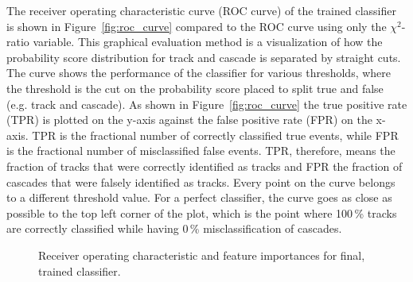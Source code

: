 The receiver operating characteristic curve (ROC curve) of the trained classifier is shown in Figure~\ref{fig:roc_curve} compared to the ROC curve using only the $\chi^2$-ratio variable.
This graphical evaluation method is a visualization of how the probability score distribution for track and cascade is separated by straight cuts.
The curve shows the performance of the classifier for various thresholds, where the threshold is the cut on the probability score placed to split true and false (e.g. track and cascade).
As shown in Figure~\ref{fig:roc_curve} the true positive rate (TPR) is plotted on the y-axis against the false positive rate (FPR) on the x-axis.
TPR is the fractional number of correctly classified true events, while FPR is the fractional number of misclassified false events.
TPR, therefore, means the fraction of tracks that were correctly identified as tracks and FPR the fraction of cascades that were falsely identified as tracks.
Every point on the curve belongs to a different threshold value.
For a perfect classifier, the curve goes as close as possible to the top left corner of the plot, which is the point where 100\,\% tracks are correctly classified while having 0\,\% misclassification of cascades.

\begin{figure}[ht]
    \centering
    \caption[Receiver operating characteristic and feature importances for the final, trained classifier]{Receiver operating characteristic and feature importances for final, trained classifier.}
\end{figure}

